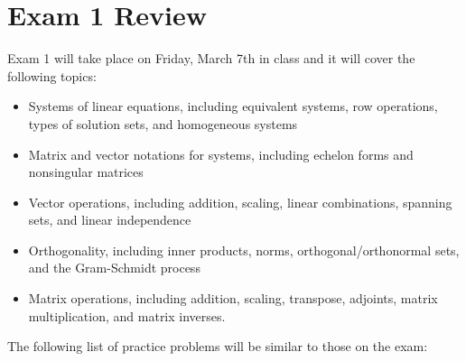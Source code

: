 \documentclass[11pt]{article}
\theoremstyle{definition}
\begin{document}
\section*{Exam 1 Review}

Exam 1 will take place on Friday, March 7th in class and it will cover the following topics: 
\begin{itemize}	
	\item Systems of linear equations, including equivalent systems, row operations, types of solution sets, and homogeneous systems
	
	\item Matrix and vector notations for systems, including echelon forms and nonsingular matrices
	
	\item Vector operations, including addition, scaling, linear combinations, spanning sets, and linear independence
	
	\item Orthogonality, including inner products, norms, orthogonal/orthonormal sets, and the Gram-Schmidt process
	
	\item Matrix operations, including addition, scaling, transpose, adjoints, matrix multiplication, and matrix inverses.
\end{itemize}

\noindent The following list of practice problems will be similar to those on the exam:
\end{document}
